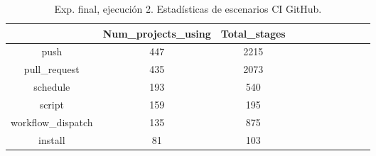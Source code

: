 \begin{table}[h]
  \centering
  \caption{Exp. final, ejecución 2. Estadísticas de escenarios CI GitHub.}
  \label{tab:tabla_f_2_4}

\begin{footnotesize}
\renewcommand{\arraystretch}{1.5} %
\begin{tabular}{ccccccccccc}
  \hline
  {} &  Num\_projects\_using &  Total\_stages \\
  \hline
  push                        &                 447 &          2215 \\
  pull\_request                &                 435 &          2073 \\
  schedule                    &                 193 &           540 \\
  script                      &                 159 &           195 \\
  workflow\_dispatch           &                 135 &           875 \\
  install                     &                  81 &           103 \\

\end{tabular}
\end{footnotesize}
\end{table}
